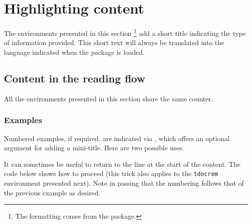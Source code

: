 \documentclass[10pt, a4paper]{article}
\begin{document}
\section{Highlighting content}

\begin{tdocnote}
    The environments presented in this section
    \footnote{
        The formatting comes from the  package.
    }
    add a short title indicating the type of information provided.
    This short text will always be translated into the language indicated when the \thispack{} package is loaded.
\end{tdocnote}


\subsection{Content in the reading flow}




\begin{tdocimp}
    All the environments presented in this section share the same counter.
\end{tdocimp}




\subsubsection{Examples}

Numbered examples, if required, are indicated via , which offers an optional argument for adding a mini-title.
Here are two possible uses.









\begin{tdoctip}
    It can sometimes be useful to return to the line at the start of the content. The code below shows how to proceed (this trick also applies to the \verb#tdocrem# environment presented next). Note in passing that the numbering follows that of the previous example as desired.
\end{tdoctip}

\end{document}
